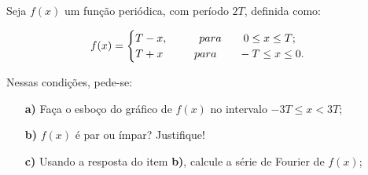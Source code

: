 \linespread{1.5}
Seja $f(x)$ um função periódica, com período $2T$, definida como:

\begin{equation*}
    f(x) = \begin{cases}
    T - x, \hspace{1cm} para \hspace{0.7cm} 0 \leq x \leq T;\\
    T + x \hspace{1cm} para \hspace{0.7cm} -T \leq x \leq 0.
    \end{cases}\,
\end{equation*}

Nessas condições, pede-se:
\begin{itemize}
    \item[\textbf{a)}] Faça o esboço do gráfico de $f(x)$ no intervalo $-3T \leq x < 3T$;
    \item[\textbf{b)}] $f(x)$ é par ou ímpar? Justifique!
    \item[\textbf{c)}] Usando a resposta do item \textbf{b)}, calcule a série de Fourier de $f(x)$;
\end{itemize}